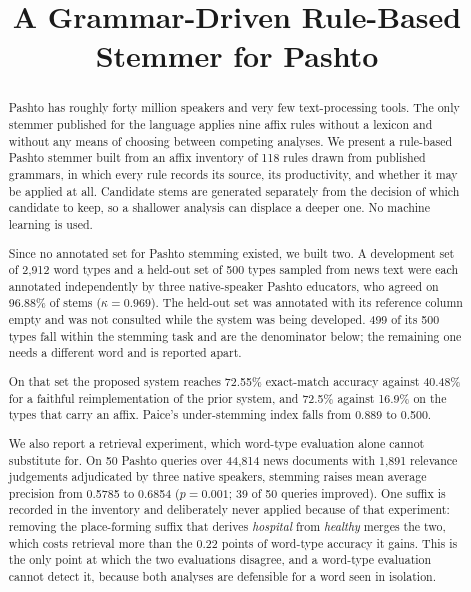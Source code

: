 \documentclass[conference]{IEEEtran}
\begin{document}
\title{A Grammar-Driven Rule-Based Stemmer for Pashto}

\author{
}

\maketitle

\begin{abstract}
Pashto has roughly forty million speakers and very few text-processing tools.
The only stemmer published for the language applies nine affix rules without a
lexicon and without any means of choosing between competing analyses. We
present a rule-based Pashto stemmer built from an affix inventory of 118 rules
drawn from published grammars, in which every rule records its source, its
productivity, and whether it may be applied at all. Candidate stems are
generated separately from the decision of which candidate to keep, so a
shallower analysis can displace a deeper one. No machine learning is used.

Since no annotated set for Pashto stemming existed, we built two. A development
set of 2{,}912 word types and a held-out set of 500 types sampled from news text
were each annotated independently by three native-speaker Pashto educators, who
agreed on 96.88\% of stems ($\kappa = 0.969$). The held-out set was annotated
with its reference column empty and was not consulted while the system was
being developed. 499 of its 500 types fall within the stemming task and are the
denominator below; the remaining one needs a different word and is reported
apart.

On that set the proposed system reaches 72.55\% exact-match accuracy against
40.48\% for a faithful reimplementation of the prior system, and 72.5\% against
16.9\% on the types that carry an affix. Paice's under-stemming index falls
from 0.889 to 0.500.

We also report a retrieval experiment, which word-type evaluation alone cannot
substitute for. On 50 Pashto queries over 44{,}814 news documents with 1{,}891
relevance judgements adjudicated by three native speakers, stemming raises mean
average precision from 0.5785 to 0.6854 ($p = 0.001$; 39 of 50 queries
improved). One suffix is recorded in the
inventory and deliberately never applied because of that experiment: removing
the place-forming suffix that derives \emph{hospital} from \emph{healthy}
merges the two, which costs retrieval more than the 0.22 points of word-type
accuracy it gains. This is the only point at which the two
evaluations disagree, and a word-type evaluation cannot detect it, because both
analyses are defensible for a word seen in isolation.


\end{abstract}
\end{document}
